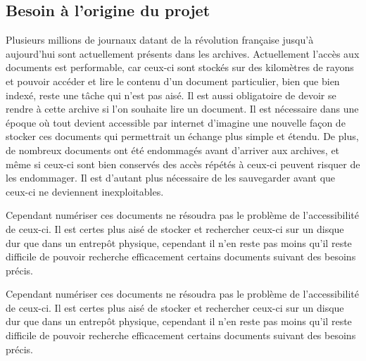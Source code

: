     \subsection{Besoin à l'origine du projet}
    \label{subsec:besoin}
    Plusieurs millions de journaux datant de la révolution française jusqu’à aujourd’hui sont actuellement présents dans les archives. Actuellement l’accès aux documents
    est performable, car ceux-ci sont stockés sur des kilomètres de rayons et pouvoir accéder et lire le contenu d’un document particulier, bien que bien indexé,
    reste une tâche qui n’est pas aisé. Il est aussi obligatoire de devoir se rendre à cette archive si l’on souhaite lire un document. Il est nécessaire dans une époque
    où tout devient accessible par internet d’imagine une nouvelle façon de stocker ces documents qui permettrait un échange plus simple et étendu. De plus, de nombreux
    documents ont été endommagés avant d’arriver aux archives, et même si ceux-ci sont bien conservés des accès répétés à ceux-ci peuvent risquer de les endommager.
    Il est d’autant plus nécessaire de les sauvegarder avant que ceux-ci ne deviennent inexploitables.

    Cependant numériser ces documents ne résoudra pas le problème de l’accessibilité de ceux-ci. Il est certes plus aisé de stocker et rechercher ceux-ci sur un disque dur
    que dans un entrepôt physique, cependant il n’en reste pas moins qu’il reste difficile de pouvoir recherche efficacement certains documents suivant des besoins précis.

    Cependant numériser ces documents ne résoudra pas le problème de l’accessibilité de ceux-ci. Il est certes plus aisé de stocker et rechercher ceux-ci sur un disque dur
    que dans un entrepôt physique, cependant il n’en reste pas moins qu’il reste difficile de pouvoir recherche efficacement certains documents suivant des besoins précis.
